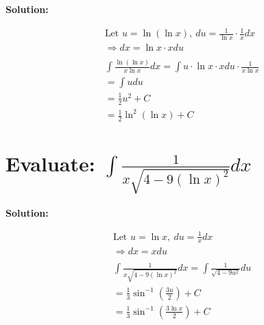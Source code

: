 \documentclass{article}
\begin{document}
\textbf{Solution:}

\begin{align*}
     & \text{Let } u = \ln(\ln x), \ du = \frac{1}{\ln x} \cdot \frac{1}{x} dx                    \\
     & \Rightarrow dx = \ln x \cdot x du                                                          \\
    \\
     & \int \frac{\ln(\ln x)}{x \ln x} dx = \int u \cdot \ln x \cdot x du \cdot \frac{1}{x \ln x} \\
     & = \int u du                                                                                \\
     & = \frac{1}{2} u^2 + C                                                                      \\
     & = {\frac{1}{2} \ln^2(\ln x) + C}
\end{align*}

\section{Evaluate: $\int \frac{1}{x \sqrt{4 - 9(\ln x)^2}} dx$}

\textbf{Solution:}

\begin{align*}
     & \text{Let }  u = \ln x, \ du = \frac{1}{x} dx                                 \\
     & \Rightarrow dx = x du                                                         \\
    \\
     & \int \frac{1}{x \sqrt{4 - 9(\ln x)^2}} dx = \int \frac{1}{\sqrt{4 - 9u^2}} du \\
     & = \frac{1}{3} \sin^{-1}\left(\frac{3u}{2}\right) + C                          \\
     & = {\frac{1}{3} \sin^{-1}\left(\frac{3\ln x}{2}\right) + C}
\end{align*}
\end{document}
